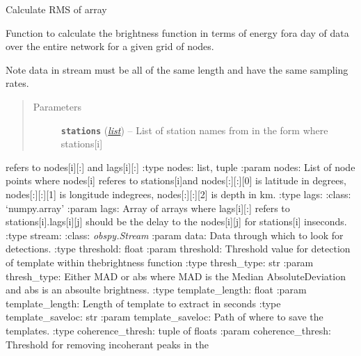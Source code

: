 \documentclass[a4paper,10pt,english]{sphinxmanual}
\begin{document}

\begin{fulllineitems}
\label{submodules/core.bright_lights:bright_lights._rms}
Calculate RMS of array

\end{fulllineitems}


\begin{fulllineitems}
\label{submodules/core.bright_lights:bright_lights.brightness}
Function to calculate the brightness function in terms of energy fora day of data over the entire network for a given grid of nodes.

Note data in stream must be all of the same length and have the same
sampling rates.
\begin{quote}\begin{description}
\item[{Parameters}] \leavevmode
\textbf{\texttt{stations}} (\href{https://docs.python.org/library/functions.html\#list}{\emph{list}}) -- List of station names from in the form where stations{[}i{]}

\end{description}\end{quote}

refers to nodes{[}i{]}{[}:{]} and lags{[}i{]}{[}:{]}
:type nodes: list, tuple
:param nodes: List of node points where nodes{[}i{]} referes to stations{[}i{]}and nodes{[}:{]}{[}:{]}{[}0{]} is latitude in degrees, nodes{[}:{]}{[}:{]}{[}1{]} is longitude indegrees, nodes{[}:{]}{[}:{]}{[}2{]} is depth in km.
:type lags: :class: `numpy.array'
:param lags: Array of arrays where lags{[}i{]}{[}:{]} refers to stations{[}i{]}.lags{[}i{]}{[}j{]} should be the delay to the nodes{[}i{]}{[}j{]} for stations{[}i{]} inseconds.
:type stream: :class: \emph{obspy.Stream}
:param data: Data through which to look for detections.
:type threshold: float
:param threshold: Threshold value for detection of template within thebrightness function
:type thresh\_type: str
:param thresh\_type: Either MAD or abs where MAD is the Median AbsoluteDeviation and abs is an absoulte brightness.
:type template\_length: float
:param template\_length: Length of template to extract in seconds
:type template\_saveloc: str
:param template\_saveloc: Path of where to save the templates.
:type coherence\_thresh: tuple of floats
:param coherence\_thresh: Threshold for removing incoherant peaks in the
\begin{quote}


\end{quote}
\end{fulllineitems}
\end{document}
